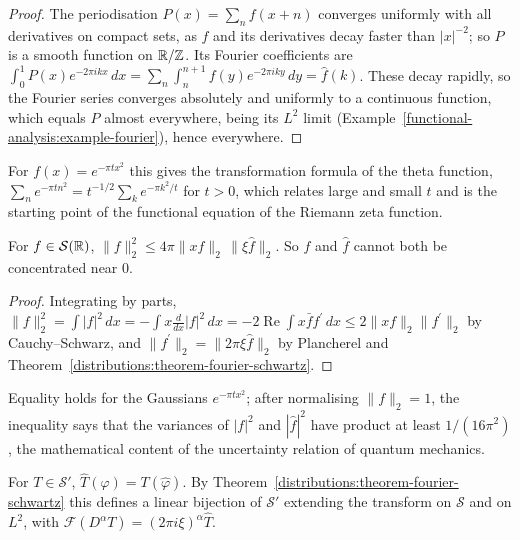 \begin{proof}
The periodisation $P(x) = \sum_nf(x + n)$ converges uniformly with all derivatives on compact sets, as $f$ and its derivatives decay faster than $|x|^{-2}$; so $P$ is a smooth function on $\mathbb{R}/\mathbb{Z}$. Its
Fourier coefficients are $\int_0^1P(x)e^{-2\pi ikx}\,dx = \sum_n\int_n^{n+1}f(y)e^{-2\pi iky}\,dy = \hat f(k)$. These decay rapidly, so the Fourier series converges absolutely and uniformly to a continuous
function, which equals $P$ almost everywhere, being its $L^2$ limit (Example~\ref{functional-analysis:example-fourier}), hence everywhere.
\end{proof}

For $f(x) = e^{-\pi tx^2}$ this gives the transformation formula of the theta function, $\sum_ne^{-\pi tn^2} = t^{-1/2}\sum_ke^{-\pi k^2/t}$ for $t > 0$, which relates large and small $t$ and is
the starting point of the functional equation of the Riemann zeta function.

\begin{proposition}\label{distributions:proposition-heisenberg}
For $f \in \mathcal{S}(\mathbb{R})$, $\|f\|_2^2 \leq 4\pi\|xf\|_2\,\|\xi\hat f\|_2$. So $f$ and $\hat f$ cannot both be concentrated near $0$.
\end{proposition}

\begin{proof}
Integrating by parts, $\|f\|_2^2 = \int|f|^2\,dx = -\int x\frac{d}{dx}|f|^2\,dx = -2\operatorname{Re}\int x\bar ff^{\prime}\,dx \leq 2\|xf\|_2\|f^{\prime}\|_2$ by Cauchy--Schwarz, and
$\|f^{\prime}\|_2 = \|2\pi\xi\hat f\|_2$ by Plancherel and Theorem~\ref{distributions:theorem-fourier-schwartz}.
\end{proof}

Equality holds for the Gaussians $e^{-\pi tx^2}$; after normalising $\|f\|_2 = 1$, the inequality says that the variances of $|f|^2$ and $|\hat f|^2$ have product at least $1/(16\pi^2)$, the mathematical
content of the uncertainty relation of quantum mechanics.

\begin{definition}\label{distributions:definition-fourier-tempered}
For $T \in \mathcal{S}'$, $\hat T(\varphi) = T(\hat\varphi)$. By Theorem~\ref{distributions:theorem-fourier-schwartz} this defines a linear bijection of $\mathcal{S}'$ extending the transform on $\mathcal{S}$
and on $L^2$, with $\mathcal{F}(D^\alpha T) = (2\pi i\xi)^\alpha\hat T$.
\end{definition}

